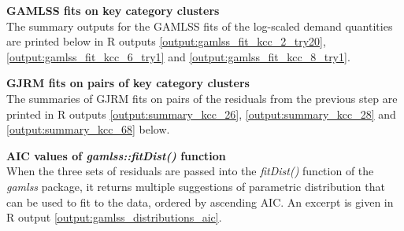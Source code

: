 
\textbf{GAMLSS fits on key category clusters}\\
The summary outputs for the \ac{GAMLSS} fits of the log-scaled demand quantities are printed below in R outputs \ref{output:gamlss_fit_kcc_2_try20},  \ref{output:gamlss_fit_kcc_6_try1} and \ref{output:gamlss_fit_kcc_8_try1}.
\\













\textbf{GJRM fits on pairs of key category clusters}\\
The summaries of \ac{GJRM} fits on pairs of the residuals from the previous step are printed in R outputs \ref{output:summary_kcc_26}, \ref{output:summary_kcc_28} and \ref{output:summary_kcc_68} below.
\\













\textbf{AIC values of \textit{gamlss::fitDist()} function} \\
When the three sets of residuals are passed into the \textit{fitDist()} function of the \textit{gamlss} package, it returns multiple suggestions of parametric distribution that can be used to fit to the data, ordered by ascending \ac{AIC}. An excerpt is given in R output \ref{output:gamlss_distributions_aic}. 
\\

